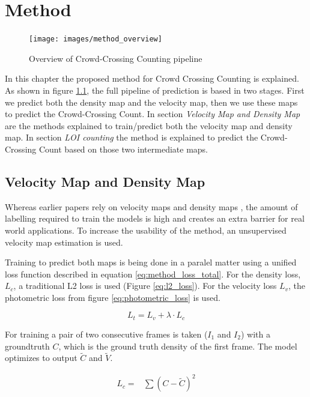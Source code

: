 \chapter{Method}

\begin{figure}[h]
\centering
\texttt{[image: images/method\_overview]}
\caption{Overview of Crowd-Crossing Counting pipeline}
\label{fig:method_overview}
\end{figure}
In this chapter the proposed method for Crowd Crossing Counting is explained. As shown in figure \ref{fig:method_overview}, the full pipeline of prediction is based in two stages. First we predict both the density map and the velocity map, then we use these maps to predict the Crowd-Crossing Count. In section \emph{Velocity Map and Density Map} are the methods explained to train/predict both the velocity map and density map. In section \emph{LOI counting} the method is explained to predict the Crowd-Crossing Count based on those two intermediate maps.



\section{Velocity Map and Density Map}
Whereas earlier papers rely on velocity maps and density maps \cite{leibe_crossing-line_2016}, the amount of labelling required to train the models is high and creates an extra barrier for real world applications. To increase the usability of the method, an unsupervised velocity map estimation is used.

Training to predict both maps is being done in a paralel matter using a unified loss function described in equation \ref{eq:method_loss_total}. For the density loss, $L_c$, a traditional L2 loss is used (Figure \ref{eq:l2_loss}). For the velocity loss $L_v$, the photometric loss from figure \ref{eq:photometric_loss} \cite{Yu2016, Janai2018} is used.

\begin{equation}
\label{eq:method_loss_total}
	L_{t} = L_{v} + \lambda \cdot L_{c}
\end{equation}

For training a pair of two consecutive frames is taken ($I_1$ and $I_2$) with a groundtruth $C$, which is the ground truth density of the first frame. The model optimizes to output $\widetilde{C}$ and $\widetilde{V}$.

\begin{equation}
\begin{aligned}
L_{c}=& \sum (C - \widetilde{C})^2
\end{aligned}
\label{eq:l2_loss}
\end{equation}

